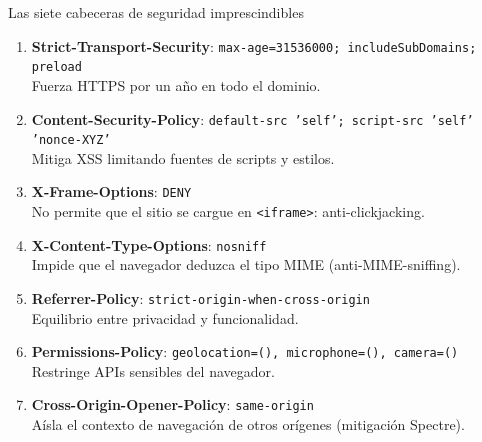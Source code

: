 \begin{cajabuenas}{Las siete cabeceras de seguridad imprescindibles}
\begin{enumerate}
\item \textbf{Strict-Transport-Security}:
\texttt{max-age=31536000; includeSubDomains; preload}\\
Fuerza HTTPS por un año en todo el dominio.

\item \textbf{Content-Security-Policy}:
\texttt{default-src 'self'; script-src 'self' 'nonce-XYZ'}\\
Mitiga XSS limitando fuentes de scripts y estilos.

\item \textbf{X-Frame-Options}: \texttt{DENY}\\
No permite que el sitio se cargue en \texttt{<iframe>}: anti-clickjacking.

\item \textbf{X-Content-Type-Options}: \texttt{nosniff}\\
Impide que el navegador deduzca el tipo MIME (anti-MIME-sniffing).

\item \textbf{Referrer-Policy}:
\texttt{strict-origin-when-cross-origin}\\
Equilibrio entre privacidad y funcionalidad.

\item \textbf{Permissions-Policy}:
\texttt{geolocation=(), microphone=(), camera=()}\\
Restringe APIs sensibles del navegador.

\item \textbf{Cross-Origin-Opener-Policy}: \texttt{same-origin}\\
Aísla el contexto de navegación de otros orígenes (mitigación
Spectre).
\end{enumerate}
\end{cajabuenas}

